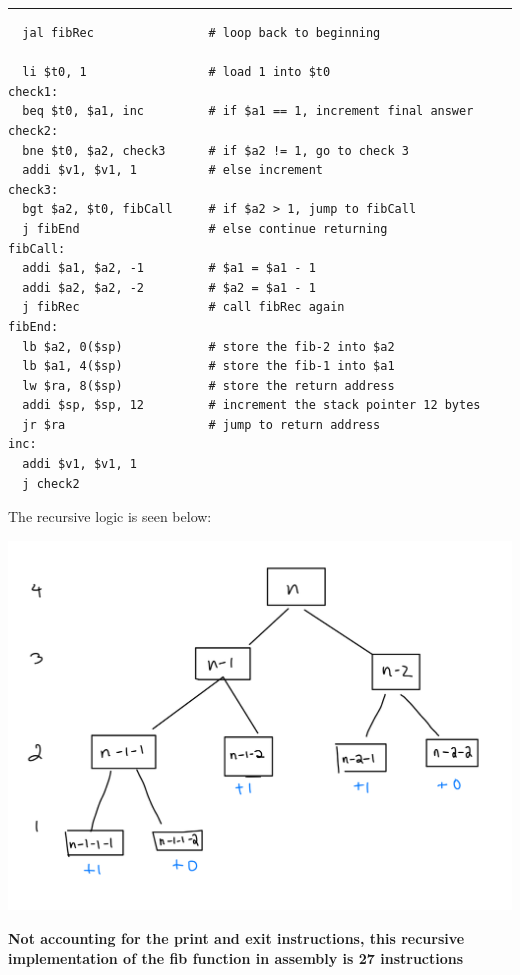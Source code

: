 \documentclass[11pt]{exam}
\newcounter{questionCounter}
\newcounter{partCounter}[questionCounter]
\newenvironment{namedquestion}[1]{%
    \addtocounter{questionCounter}{1}%
    \setcounter{partCounter}{0}%
    \vspace{.2in}%
        \noindent{\bf #1}%
    \vspace{0.3em} \hrule \vspace{.1in}%
}{}
\begin{document}
\begin{namedquestion}{Question 2.31}
\begin{verbatim}
  jal fibRec                # loop back to beginning
  
  li $t0, 1                 # load 1 into $t0  
check1:
  beq $t0, $a1, inc         # if $a1 == 1, increment final answer
check2: 
  bne $t0, $a2, check3      # if $a2 != 1, go to check 3
  addi $v1, $v1, 1          # else increment
check3: 
  bgt $a2, $t0, fibCall     # if $a2 > 1, jump to fibCall
  j fibEnd                  # else continue returning
fibCall:
  addi $a1, $a2, -1         # $a1 = $a1 - 1
  addi $a2, $a2, -2         # $a2 = $a1 - 1
  j fibRec                  # call fibRec again
fibEnd:
  lb $a2, 0($sp)            # store the fib-2 into $a2
  lb $a1, 4($sp)            # store the fib-1 into $a1
  lw $ra, 8($sp)            # store the return address
  addi $sp, $sp, 12         # increment the stack pointer 12 bytes
  jr $ra                    # jump to return address
inc:
  addi $v1, $v1, 1      
  j check2                  
\end{verbatim}
\newpage
The recursive logic is seen below: 

\begin{center}
  \includegraphics[scale=0.30]{etc/lab3-rec.png}
\end{center}

\textbf{Not accounting for the print and exit instructions, this recursive implementation of the fib function in assembly is 27 instructions}

\end{namedquestion}
\end{document}
